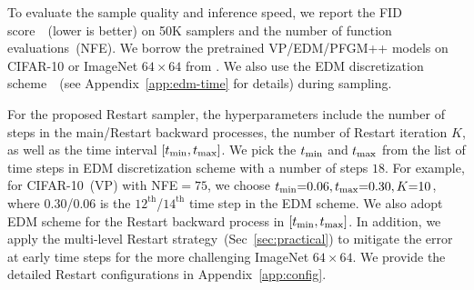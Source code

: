 
To evaluate the sample quality and inference speed, we report the FID score~\cite{Heusel2017GANsTB}~(lower is better) on 50K samplers and the number of function evaluations~(NFE). We borrow the pretrained VP/EDM/PFGM++ models on CIFAR-10 or ImageNet $64\times 64$ from \cite{Karras2022ElucidatingTD, Xu2023PFGMUT}. We also use the EDM discretization scheme~\cite{Karras2022ElucidatingTD}~(see Appendix~\ref{app:edm-time} for details) during sampling. 




For the proposed Restart sampler, the hyperparameters include the number of steps in the main/Restart backward processes, the number of Restart iteration $K$, as well as the time interval $[t_{\textrm{min}}, t_{\textrm{max}}]$. 
We pick the $t_{\textrm{min}}$ and $t_{\textrm{max}}$ from the list of time steps in EDM discretization scheme with a number of steps $18$. For example, for CIFAR-10~(VP) with NFE${=}75$, we choose $t_{\textrm{min}}{=}0.06,t_{\textrm{max}}{=}0.30,  K{=}10$, where $0.30$/$0.06$ is the $12^{\textrm{th}}$/$14^{\textrm{th}}$ time step in the EDM scheme. We also adopt EDM scheme for the Restart backward process in $[t_{\textrm{min}}, t_{\textrm{max}}]$. In addition, we apply the multi-level Restart strategy~(Sec~\ref{sec:practical}) to mitigate the error at early time steps for the more challenging ImageNet $64\times 64$. We provide the detailed Restart configurations in Appendix~\ref{app:config}. 

